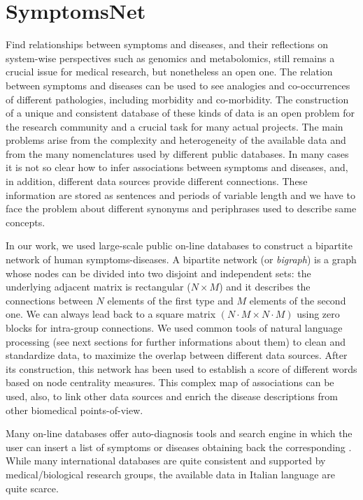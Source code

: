 \documentclass{standalone}
\begin{document}
\section[SymptomsNet]{SymptomsNet}\label{chimera:symptomsnet}

Find relationships between symptoms and diseases, and their reflections on system-wise perspectives such as genomics and metabolomics, still remains a crucial issue for medical research, but nonetheless an open one.
The relation between symptoms and diseases can be used to see analogies and co-occurrences of different pathologies, including morbidity and co-morbidity.
The construction of a unique and consistent database of these kinds of data is an open problem for the research community and a crucial task for many actual projects.
The main problems arise from the complexity and heterogeneity of the available data and from the many nomenclatures used by different public databases.
In many cases it is not so clear how to infer associations between symptoms and diseases, and, in addition, different data sources provide different connections.
These information are stored as sentences and periods of variable length and we have to face the problem about different synonyms and periphrases used to describe same concepts.

In our work, we used large-scale public on-line databases to construct a bipartite network of human symptoms-diseases.
A bipartite network (or \emph{bigraph}) is a graph whose nodes can be divided into two disjoint and independent sets: the underlying adjacent matrix is rectangular ($N\times M$) and it describes the connections between $N$ elements of the first type and $M$ elements of the second one.
We can always lead back to a square matrix $(N\cdot M \times N\cdot M)$ using zero blocks for intra-group connections.
We used common tools of natural language processing (see next sections for further informations about them) to clean and standardize data, to maximize the overlap between different data sources.
After its construction, this network has been used to establish a score of different words based on node centrality measures.
This complex map of associations can be used, also, to link other data sources and enrich the disease descriptions from other biomedical points-of-view.

Many on-line databases offer auto-diagnosis tools and search engine in which the user can insert a list of symptoms or diseases obtaining back the corresponding .
While many international databases are quite consistent and supported by medical/biological research groups, the available data in Italian language are quite scarce.
\end{document}
